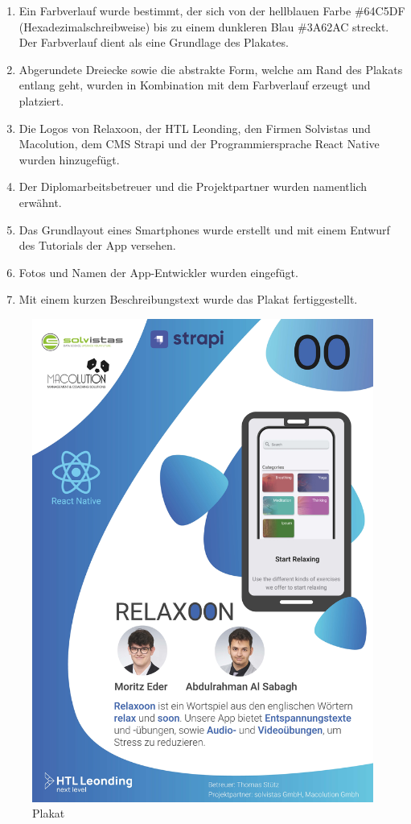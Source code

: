\begin{spacing}{1}
    \begin{enumerate}
        \item Ein Farbverlauf wurde bestimmt, der sich von der hellblauen Farbe \#64C5DF (Hexadezimalschreibweise)
              bis zu einem dunkleren Blau \#3A62AC streckt. Der Farbverlauf dient als eine Grundlage des Plakates.
        \item Abgerundete Dreiecke sowie die abstrakte Form, welche am Rand des Plakats entlang geht,
              wurden in Kombination mit dem Farbverlauf erzeugt und platziert.
        \item Die Logos von Relaxoon, der HTL Leonding, den Firmen Solvistas und Macolution, dem CMS Strapi und der Programmiersprache React Native wurden hinzugefügt.
        \item Der Diplomarbeitsbetreuer und die Projektpartner wurden namentlich erwähnt.
        \item Das Grundlayout eines Smartphones wurde erstellt und mit einem Entwurf des Tutorials der App versehen.
        \item Fotos und Namen der App-Entwickler wurden eingefügt.
        \item Mit einem kurzen Beschreibungstext wurde das Plakat fertiggestellt.
    \end{enumerate}


    \begin{figure}[H]
        \centering
        \includegraphics[height=1.4\textwidth]{./pics/Relaxoon-Plakat.jpg}
        \caption{Plakat}
    \end{figure}


\end{spacing}


